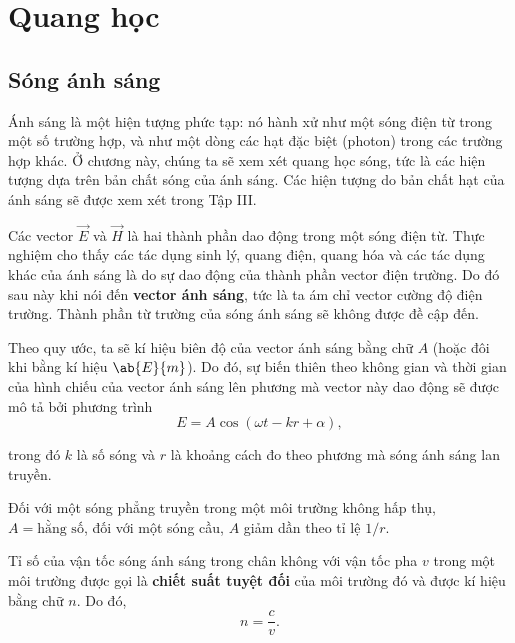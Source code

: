 

\chapter[QUANG HỌC]{Quang học}\label{chap:16}

\section{Sóng ánh sáng}\label{sec:16_1}
\vspace{-12pt}
Ánh sáng là một hiện tượng phức tạp: nó hành xử như một sóng điện từ trong một số trường hợp, và như một dòng các hạt đặc biệt (photon) trong các trường hợp khác. Ở chương này, chúng ta sẽ xem xét quang học sóng, tức là các hiện tượng dựa trên bản chất sóng của ánh sáng. 
Các hiện tượng do bản chất hạt của ánh sáng sẽ được xem xét trong Tập III.


Các vector $\vec{E}$ và $\vec{H}$ là hai thành phần dao động trong một sóng điện từ.
Thực nghiệm cho thấy các tác dụng sinh lý, quang điện, quang hóa và các tác dụng khác của ánh sáng là do sự dao động của thành phần vector điện trường. Do đó sau này khi nói đến \textbf{vector ánh sáng}, tức là ta ám chỉ vector cường độ điện trường. Thành phần từ trường của sóng ánh sáng sẽ không được đề cập đến.


Theo quy ước, ta sẽ kí hiệu biên độ của vector ánh sáng bằng chữ $A$ (hoặc đôi khi bằng kí hiệu $\ab{E}{m}$).
Do đó, sự biến thiên theo không gian và thời gian của hình chiếu của vector ánh sáng lên phương mà vector này dao động sẽ được mô tả bởi phương trình
\begin{equation}\label{eq:16_1}
    E = A \cos(\omega t - kr + \alpha),
\end{equation}

\noindent
trong đó $k$ là số sóng và $r$ là khoảng cách đo theo phương mà sóng ánh sáng lan truyền.

Đối với một sóng phẳng truyền trong một môi trường không hấp thụ, $A = \text{hằng số}$, đối với một sóng cầu, $A$ giảm dần theo tỉ lệ $1/r$.

Tỉ số của vận tốc sóng ánh sáng trong chân không với vận tốc pha $v$ trong một môi trường được gọi là \textbf{chiết suất tuyệt đối} của môi trường đó và được kí hiệu bằng chữ $n$.
Do đó,
\begin{equation}\label{eq:16_2}
    n = \frac{c}{v}.
\end{equation}

